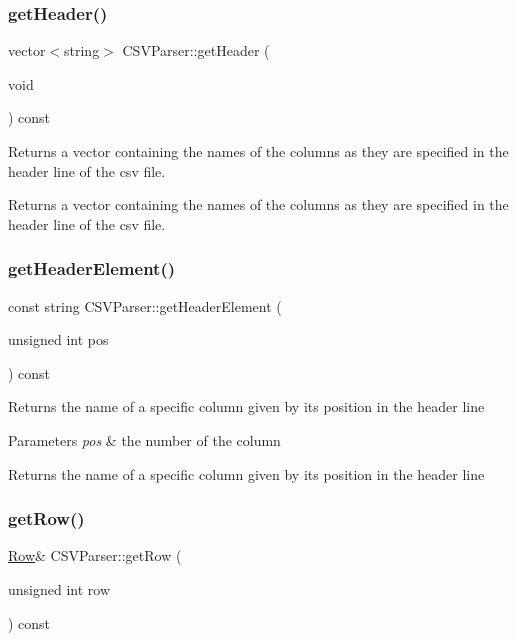 \subsubsection{\texorpdfstring{getHeader()}{getHeader()}}
{\footnotesize\ttfamily vector$<$string$>$ C\+S\+V\+Parser\+::get\+Header (\begin{DoxyParamCaption}\item[{void}]{ }\end{DoxyParamCaption}) const}

Returns a vector containing the names of the columns as they are specified in the header line of the csv file. \begin{DoxyReturn}{Returns}
a vector containing the names of the columns as they are specified in the header line of the csv file. 
\end{DoxyReturn}
\mbox{\label{class_c_s_v_parser_ad58dc7b467216ecb75f3bea681af3051}} 
\subsubsection{\texorpdfstring{getHeaderElement()}{getHeaderElement()}}
{\footnotesize\ttfamily const string C\+S\+V\+Parser\+::get\+Header\+Element (\begin{DoxyParamCaption}\item[{unsigned int}]{pos }\end{DoxyParamCaption}) const}

Returns the name of a specific column given by its position in the header line 
\begin{DoxyParams}{Parameters}
{\em pos} & the number of the column \\
\hline
\end{DoxyParams}
\begin{DoxyReturn}{Returns}
the name of a specific column given by its position in the header line 
\end{DoxyReturn}
\mbox{\label{class_c_s_v_parser_a93789f318f0abd972860c507b89d4587}} 
\subsubsection{\texorpdfstring{getRow()}{getRow()}}
{\footnotesize\ttfamily \mbox{\hyperlink{class_row}{Row}}\& C\+S\+V\+Parser\+::get\+Row (\begin{DoxyParamCaption}\item[{unsigned int}]{row }\end{DoxyParamCaption}) const}

